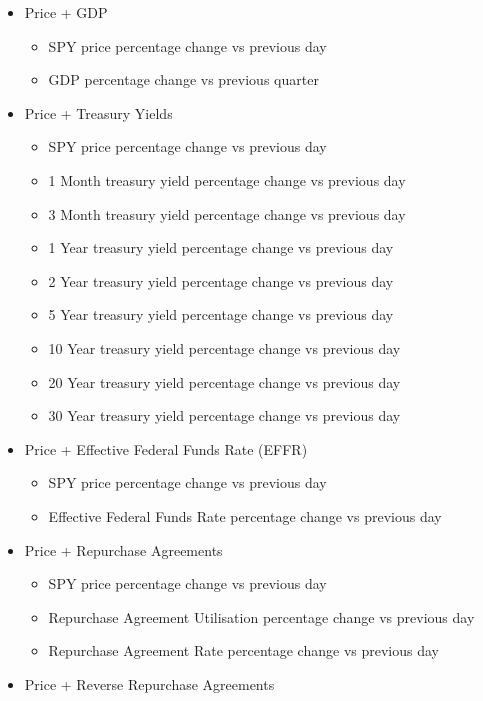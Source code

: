 \begin{itemize}
\begin{itemize}
    \end{itemize}
    \item Price + GDP
    \begin{itemize}
        \item SPY price percentage change vs previous day
        \item GDP percentage change vs previous quarter
    \end{itemize}
    \item Price + Treasury Yields
    \begin{itemize}
        \item SPY price percentage change vs previous day
        \item 1 Month treasury yield percentage change vs previous day
        \item 3 Month treasury yield percentage change vs previous day
        \item 1 Year treasury yield percentage change vs previous day
        \item 2 Year treasury yield percentage change vs previous day
        \item 5 Year treasury yield percentage change vs previous day
        \item 10 Year treasury yield percentage change vs previous day
        \item 20 Year treasury yield percentage change vs previous day
        \item 30 Year treasury yield percentage change vs previous day
    \end{itemize}
    \item Price + Effective Federal Funds Rate (EFFR)
    \begin{itemize}
        \item SPY price percentage change vs previous day
        \item Effective Federal Funds Rate percentage change vs previous day
    \end{itemize}
    \item Price + Repurchase Agreements
    \begin{itemize}
        \item SPY price percentage change vs previous day
        \item Repurchase Agreement Utilisation percentage change vs previous day
        \item Repurchase Agreement Rate percentage change vs previous day
    \end{itemize}
    \item Price + Reverse Repurchase Agreements

\end{itemize}
